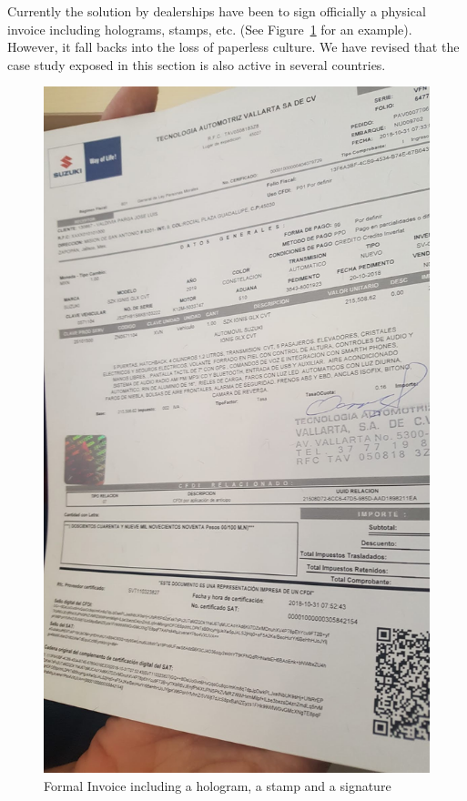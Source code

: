 Currently the solution by dealerships have been to sign officially a physical invoice 
including holograms, stamps, etc. (See Figure~\ref{fig:invoice} for an example). 
However, it fall backs into the loss of paperless culture. We have revised that the case 
study exposed in this section is also active in several countries.
\begin{figure}[hbt]
  \centering
    \includegraphics[scale=0.1]{images/invoice.jpg}
        \caption{Formal Invoice including a hologram, a stamp and a signature}
    \label{fig:invoice}
\end{figure}

